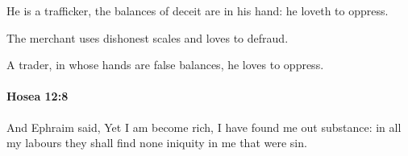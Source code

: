 			\begin{versebox}
					\item[BHS] 
					\item[LXX] 
					\item[ASV] He is a trafficker, the balances of deceit are in his hand: he loveth to oppress.
					\item[NIV] The merchant uses dishonest scales and loves to defraud.
					\item[NRSV] A trader, in whose hands are false balances, he loves to oppress.
			\end{versebox}

		\paragraph{Hosea 12:8} %
			\label{HOSEA-12-8}

			And Ephraim said, Yet I am become rich, I have found me out substance: in all my labours they shall find none iniquity in me that were sin.

